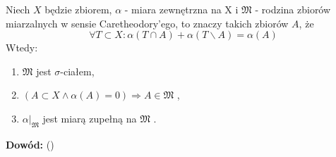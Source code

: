 \begin{tw}
	Niech $X$ będzie zbiorem, $\alpha$ - miara zewnętrzna na X i $\mathfrak{M}$ - rodzina zbiorów miarzalnych w sensie Caretheodory'ego, to znaczy takich zbiorów $A$, że 
	$$
	\forall T \subset X: \alpha(T \cap A)  + \alpha(T \backslash A) = \alpha(A)
	$$
	Wtedy:
	\begin{enumerate}	
		\item $\mathfrak{M}$ jest $\sigma$-ciałem,
		\item $(A \subset X \wedge \alpha(A) = 0) \Longrightarrow A \in \mathfrak{M}$ ,
		\item $\alpha|_{\mathfrak{M}}$ jest miarą zupełną na $\mathfrak{M}$ .
	\end{enumerate}
	\textbf{Dowód:} (\citep[AM4, 2.30]{Tworzewski}) 
\end{tw}